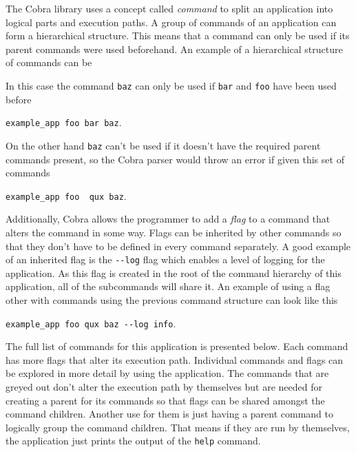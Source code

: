 The Cobra library uses a concept called \textit{command} to split an application into logical parts and execution paths. A group of commands of an application can form a hierarchical structure. This means that a command can only be used if its parent commands were used beforehand. An example of a hierarchical structure of commands can be

\vspace{0.5em}
\vspace{0.5em}

\noindent In this case the command \texttt{baz} can only be used if \texttt{bar} and \texttt{foo} have been used before
\begin{center}
  \texttt{example\_app foo bar baz}.
\end{center}
On the other hand \texttt{baz} can't be used if it doesn't have the required parent commands present, so the Cobra parser would throw an error if given this set of commands
\begin{center}
  \texttt{example\_app foo {\color{red} qux} baz}.
\end{center}
Additionally, Cobra allows the programmer to add a \textit{flag} to a command that alters the command in some way. Flags can be inherited by other commands so that they don't have to be defined in every command separately. A good example of an inherited flag is the \texttt{-\--log} flag which enables a level of logging for the application. As this flag is created in the root of the command hierarchy of this application, all of the subcommands will share it. An example of using a flag other with commands using the previous command structure can look like this
\begin{center}
  \texttt{example\_app foo qux baz -\--log info}.
\end{center}

The full list of commands for this application is presented below. Each command has more flags that alter its execution path. Individual commands and flags can be explored in more detail by using the application. The commands that are greyed out don't alter the execution path by themselves but are needed for creating a parent for its commands so that flags can be shared amongst the command children. Another use for them is just having a parent command to logically group the command children. That means if they are run by themselves, the application just prints the output of the \texttt{help} command.

\vspace{0.5em}
